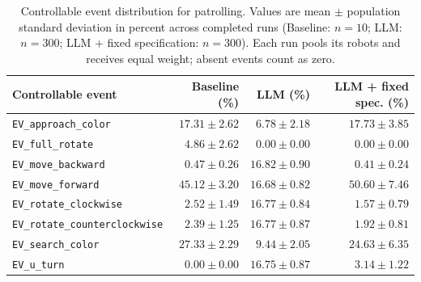 \begin{table}[htbp]
\centering
\small
\caption{Controllable event distribution for patrolling. Values are mean $\pm$ population standard deviation in percent across completed runs (Baseline: $n=10$; LLM: $n=300$; LLM + fixed specification: $n=300$). Each run pools its robots and receives equal weight; absent events count as zero.}
\label{tab:patrolling-controllable-events}
\begin{tabular}{lrrr}
\hline
Controllable event & Baseline (\%) & LLM (\%) & LLM + fixed spec. (\%) \\
\hline
\texttt{EV\_approach\_color} & $17.31 \pm 2.62$ & $6.78 \pm 2.18$ & $17.73 \pm 3.85$ \\
\texttt{EV\_full\_rotate} & $4.86 \pm 2.62$ & $0.00 \pm 0.00$ & $0.00 \pm 0.00$ \\
\texttt{EV\_move\_backward} & $0.47 \pm 0.26$ & $16.82 \pm 0.90$ & $0.41 \pm 0.24$ \\
\texttt{EV\_move\_forward} & $45.12 \pm 3.20$ & $16.68 \pm 0.82$ & $50.60 \pm 7.46$ \\
\texttt{EV\_rotate\_clockwise} & $2.52 \pm 1.49$ & $16.77 \pm 0.84$ & $1.57 \pm 0.79$ \\
\texttt{EV\_rotate\_counterclockwise} & $2.39 \pm 1.25$ & $16.77 \pm 0.87$ & $1.92 \pm 0.81$ \\
\texttt{EV\_search\_color} & $27.33 \pm 2.29$ & $9.44 \pm 2.05$ & $24.63 \pm 6.35$ \\
\texttt{EV\_u\_turn} & $0.00 \pm 0.00$ & $16.75 \pm 0.87$ & $3.14 \pm 1.22$ \\
\hline
\end{tabular}
\end{table}
